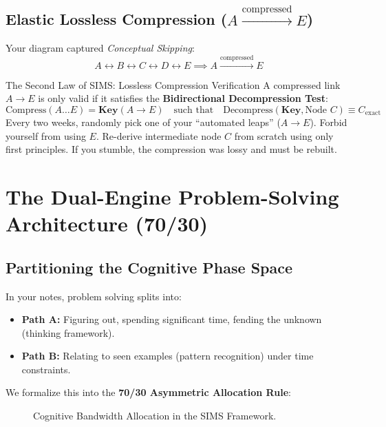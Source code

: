\documentclass[11pt,a4paper]{article}
\begin{document}
\subsection{Elastic Lossless Compression ($A \xrightarrow{\text{compressed}} E$)}
Your diagram captured \textit{Conceptual Skipping}:
\[
A \longleftrightarrow B \longleftrightarrow C \longleftrightarrow D \longleftrightarrow E \implies A \xrightarrow{\text{compressed}} E
\]

\begin{lawbox}{The Second Law of SIMS: Lossless Compression Verification}
A compressed link $A \to E$ is only valid if it satisfies the \textbf{Bidirectional Decompression Test}:
\begin{equation}
    \text{Compress}(A \dots E) = \mathbf{Key}(A \to E) \quad \text{such that} \quad \mathrm{Decompress}(\mathbf{Key}, \text{Node } C) \equiv C_{\text{exact}}
\end{equation}
Every two weeks, randomly pick one of your ``automated leaps'' ($A \to E$). Forbid yourself from using $E$. Re-derive intermediate node $C$ from scratch using only first principles. If you stumble, the compression was lossy and must be rebuilt.
\end{lawbox}

\section{The Dual-Engine Problem-Solving Architecture (70/30)}

\subsection{Partitioning the Cognitive Phase Space}
In your notes, problem solving splits into:
\begin{itemize}
    \item \textbf{Path A:} Figuring out, spending significant time, fending the unknown (thinking framework).
    \item \textbf{Path B:} Relating to seen examples (pattern recognition) under time constraints.
\end{itemize}

We formalize this into the \textbf{70/30 Asymmetric Allocation Rule}:

\begin{figure}[h!]
\centering
{}
\caption{Cognitive Bandwidth Allocation in the SIMS Framework.}
\end{figure}
\end{document}
